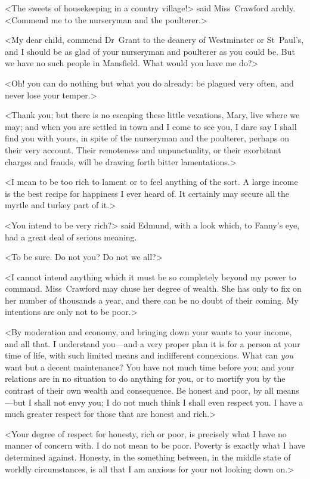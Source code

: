 <The sweets of housekeeping in a country village!> said Miss~Crawford archly. <Commend me to the nurseryman and the poulterer.>

<My dear child, commend Dr~Grant to the deanery of Westminster or St~Paul's, and I should be as glad of your nurseryman and poulterer as you could be. But we have no such people in Mansfield. What would you have me do?>

<Oh! you can do nothing but what you do already: be plagued very often, and never lose your temper.>

<Thank you; but there is no escaping these little vexations, Mary, live where we may; and when you are settled in town and I come to see you, I dare say I shall find you with yours, in spite of the nurseryman and the poulterer, perhaps on their very account. Their remoteness and unpunctuality, or their exorbitant charges and frauds, will be drawing forth bitter lamentations.>

<I mean to be too rich to lament or to feel anything of the sort. A large income is the best recipe for happiness I ever heard of. It certainly may secure all the myrtle and turkey part of it.>

<You intend to be very rich?> said Edmund, with a look which, to Fanny's eye, had a great deal of serious meaning.

<To be sure. Do not you? Do not we all?>

<I cannot intend anything which it must be so completely beyond my power to command. Miss~Crawford may chuse her degree of wealth. She has only to fix on her number of thousands a year, and there can be no doubt of their coming. My intentions are only not to be poor.>

<By moderation and economy, and bringing down your wants to your income, and all that. I understand you—and a very proper plan it is for a person at your time of life, with such limited means and indifferent connexions. What can \textit{you}  want but a decent maintenance? You have not much time before you; and your relations are in no situation to do anything for you, or to mortify you by the contrast of their own wealth and consequence. Be honest and poor, by all means—but I shall not envy you; I do not much think I shall even respect you. I have a much greater respect for those that are honest and rich.>

<Your degree of respect for honesty, rich or poor, is precisely what I have no manner of concern with. I do not mean to be poor. Poverty is exactly what I have determined against. Honesty, in the something between, in the middle state of worldly circumstances, is all that I am anxious for your not looking down on.>

